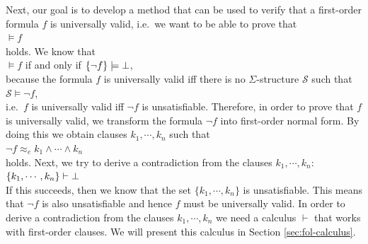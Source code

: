 Next, our goal is to develop a method that can be used to verify that a first-order formula
$f$ is universally valid, i.e.~we want to be able to prove that \\[0.2cm]
\hspace*{1.3cm}
$\models f$
\\[0.2cm]
holds.  We know that \\[0.2cm]
\hspace*{1.3cm}
$\models f$ \quad if and only if \quad $\{\neg f\} \models \bot$, \\[0.2cm]
because the formula $f$ is universally valid iff there is no $\Sigma$-structure $\mathcal{S}$ such that
\\[0.2cm]
\hspace*{1.3cm}
$\mathcal{S} \models \neg f$,
\\[0.2cm]
i.e.~$f$ is universally valid iff $\neg f$ is unsatisfiable. 
Therefore, in order to prove that $f$ is universally valid, we transform the formula $\neg f$  into 
first-order normal form.  By doing this we obtain clauses $k_1, \cdots, k_n$ such that \\[0.2cm]
\hspace*{1.3cm} $\neg f \approx_e k_1 \wedge \cdots \wedge k_n$ \\[0.2cm]
holds.  Next,  we try to
derive a contradiction from the clauses $k_1,\cdots,k_n$: \\[0.2cm]
\hspace*{1.3cm} $\{k_1, \cdots, k_n\} \vdash \bot$ \\[0.2cm]
If this succeeds, then we know that the set $\{k_1, \cdots, k_n\}$ is unsatisfiable.
This means that $\neg f$ is also unsatisfiable and hence $f$ must be universally valid.
In order to derive a contradiction from the clauses $k_1,\cdots,k_n$
we need a calculus $\vdash$ that works with first-order clauses. 
We will present this calculus in Section \ref{sec:fol-calculus}.

